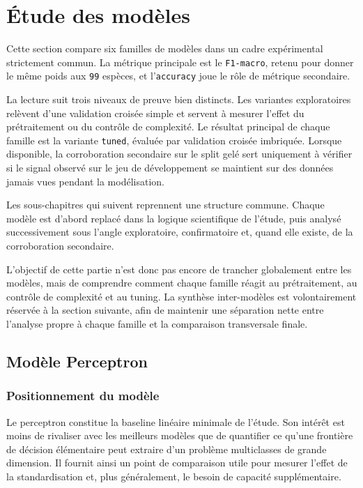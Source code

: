 \section{Étude des modèles}

Cette section compare six familles de modèles dans un cadre expérimental strictement commun. La métrique principale est le \texttt{F1-macro}, retenu pour donner le même poids aux \texttt{99} espèces, et l'\texttt{accuracy} joue le rôle de métrique secondaire.

La lecture suit trois niveaux de preuve bien distincts. Les variantes exploratoires relèvent d'une validation croisée simple et servent à mesurer l'effet du prétraitement ou du contrôle de complexité. Le résultat principal de chaque famille est la variante \texttt{tuned}, évaluée par validation croisée imbriquée. Lorsque disponible, la corroboration secondaire sur le split gelé sert uniquement à vérifier si le signal observé sur le jeu de développement se maintient sur des données jamais vues pendant la modélisation.

Les sous-chapitres qui suivent reprennent une structure commune. Chaque modèle est d'abord replacé dans la logique scientifique de l'étude, puis analysé successivement sous l'angle exploratoire, confirmatoire et, quand elle existe, de la corroboration secondaire.

L'objectif de cette partie n'est donc pas encore de trancher globalement entre les modèles, mais de comprendre comment chaque famille réagit au prétraitement, au contrôle de complexité et au tuning. La synthèse inter-modèles est volontairement réservée à la section suivante, afin de maintenir une séparation nette entre l'analyse propre à chaque famille et la comparaison transversale finale.

\subsection{Modèle Perceptron}

\subsubsection{Positionnement du modèle}
Le perceptron constitue la baseline linéaire minimale de l'étude. Son intérêt est moins de rivaliser avec les meilleurs modèles que de quantifier ce qu'une frontière de décision élémentaire peut extraire d'un problème multiclasses de grande dimension. Il fournit ainsi un point de comparaison utile pour mesurer l'effet de la standardisation et, plus généralement, le besoin de capacité supplémentaire.

